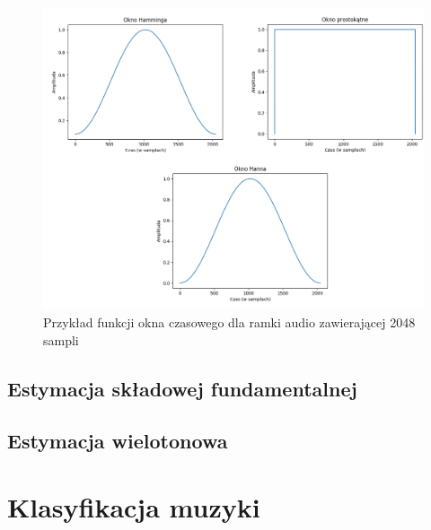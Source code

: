 \documentclass[12pt,a4paper,twoside]{mwart}
\begin{document}
\begin{figure}[H]
  \begin{center}
    \includegraphics[scale=1.4]{images/WindowFunctions.png}
    \caption{Przykład funkcji okna czasowego dla ramki audio zawierającej 2048 sampli}
  \end{center}
\end{figure}
\newpage

\subsection{Estymacja składowej fundamentalnej}
\newpage

\subsection{Estymacja wielotonowa}


\newpage
\section{Klasyfikacja muzyki}
\cite{DBLP:journals/corr/abs-1708-03535}\cite{DBLP:journals/corr/XiongDHSSSYZ16a}
\end{document}
